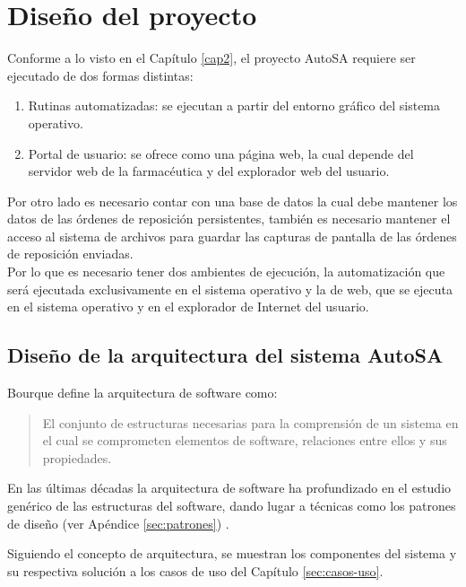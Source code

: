 \chapter{Diseño del proyecto}\label{cap3}
Conforme a lo visto en el Capítulo \ref{cap2}, el proyecto AutoSA requiere ser ejecutado de dos formas distintas:
\begin{enumerate}
 	\item Rutinas automatizadas: se ejecutan a partir del entorno gráfico del sistema operativo.
 	\item Portal de usuario: se ofrece como una página web, la cual depende del servidor web de la farmacéutica y del explorador web del usuario.
\end{enumerate}
Por otro lado es necesario contar con una base de datos la cual debe mantener los datos de las órdenes de reposición persistentes, también es necesario mantener el acceso al sistema de archivos para guardar las capturas de pantalla de las órdenes de reposición enviadas.\\
Por lo que es necesario tener dos ambientes de ejecución, la automatización que será ejecutada exclusivamente en el sistema operativo y la de web, que se ejecuta en el sistema operativo y en el explorador de Internet del usuario.




\section{Diseño de la arquitectura del sistema AutoSA}
Bourque\cite{SWEBOOK} define la arquitectura de software como:
\begin{quote}
	El conjunto de estructuras necesarias para la comprensión de un sistema en el cual se comprometen elementos de software, relaciones entre ellos y sus propiedades.
\end{quote}
En las últimas décadas la arquitectura de software ha profundizado en el estudio genérico de las estructuras del software, dando lugar a técnicas como los patrones de diseño (ver Apéndice \ref{sec:patrones}) \cite{SWEBOOK, SoftwareArchitectureInAction}.

Siguiendo el concepto de arquitectura, se muestran los componentes del sistema y su respectiva solución a los casos de uso del Capítulo \ref{sec:casos-uso}.

